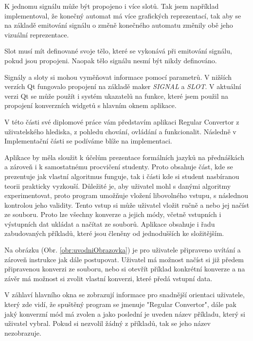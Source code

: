 K jednomu signálu může být propojeno i více slotů. Tak jsem například implementoval, že konečný automat má více grafických reprezentací, tak aby se na základě emitování signálu o změně konečného automatu změnily obě jeho vizuální reprezentace.

Slot musí mít definované svoje tělo, které se vykonává při emitování signálu, pokud jsou propojeni. Naopak tělo signálu nesmí být nikdy definováno.

Signály a sloty si mohou vyměňovat informace pomocí parametrů. V nižších verzích Qt fungovalo propojení na základě maker \textit{SIGNAL} a \textit{SLOT}. V aktuální verzi Qt se může použít i systém ukazatelů na funkce, které jsem použil na propojení konverzních widgetů s hlavním oknem aplikace.



V této části své diplomové práce vám představím aplikaci Regular Convertor z uživatelského hlediska, z pohledu chování, ovládání a funkcionalit. Následně v Implementační části se podíváme blíže na implementaci.

Aplikace by měla sloužit k účelům prezentace formálních jazyků na přednáškách a zároveň i k samostatnému procvičení studenty. Proto obsahuje část, kde se prezentuje jak vlastní algoritmus funguje, tak i části kde si student nasbíranou teorii prakticky vyzkouší. Důležité je, aby uživatel mohl s danými algoritmy experimentovat, proto program umožňuje vložení libovolného vstupu, s následnou kontrolou jeho validity. Tento vstup si může uživatel vložit ručně a nebo jej načíst ze souboru. Proto lze všechny konverze a jejich módy, včetně vstupních i výstupních dat ukládat a načítat ze souborů. Aplikace obsahuje i řadu zabudovaných příkladů, které jsou členěny od jednodušších ke složitějším.


Na obrázku (Obr. \ref{obr:uvodniObrazovka}) je pro uživatele připraveno uvítání a zároveň instrukce jak dále postupovat. Uživatel má možnost načíst si již předem připravenou konverzi ze souboru, nebo si otevřít příklad konkrétní konverze a na závěr má možnost si zvolit vlastní konverzi, které předá vstupní data.



V záhlaví hlavního okna se zobrazují informace pro snadnější orientaci uživatele, který zde vidí, že spuštěný program se jmenuje "Regular Convertor", dále pak jaký konverzní mód má zvolen a jako poslední je uveden název příkladu, který si uživatel vybral. Pokud si nezvolil žádný z příkladů, tak se jeho název nezobrazuje.

